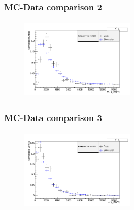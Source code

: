 \documentclass[]{beamer}
\begin{document}
\begin{frame}
\frametitle{MC-Data comparison 2}

\begin{figure}
\includegraphics[width=5.5cm,height=4.0cm]{pics/p_KPlus_comp.png}
\end{figure}

\end{frame}

\begin{frame}
\frametitle{MC-Data comparison 3}

\begin{figure}
\includegraphics[width=5.5cm,height=4.0cm]{pics/p_piPlus_comp.png}
\end{figure}

\end{frame}
\end{document}
